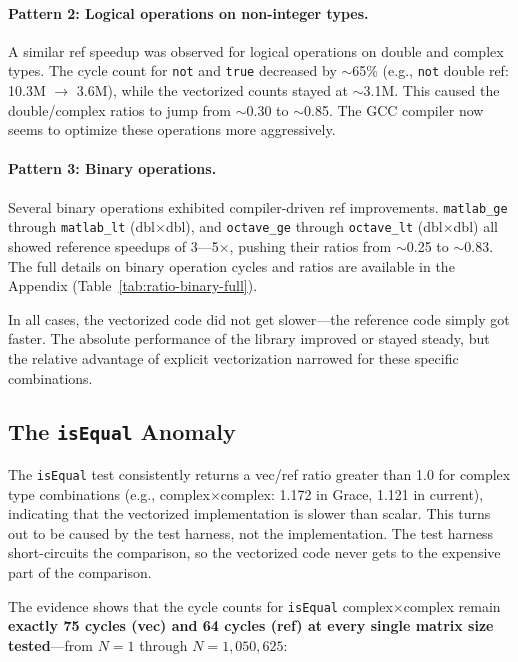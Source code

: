 \paragraph{Pattern 2: Logical operations on non-integer types.} A similar ref speedup was observed for logical operations on double and complex types. The cycle count for \texttt{not} and \texttt{true} decreased by $\sim$65\% (e.g., \texttt{not} double ref: 10.3M $\rightarrow$ 3.6M), while the vectorized counts stayed at $\sim$3.1M. This caused the double/complex ratios to jump from $\sim$0.30 to $\sim$0.85. The GCC compiler now seems to optimize these operations more aggressively.

\paragraph{Pattern 3: Binary operations.} Several binary operations exhibited compiler-driven ref improvements. \texttt{matlab\_ge} through \texttt{matlab\_lt} (dbl$\times$dbl), and \texttt{octave\_ge} through \texttt{octave\_lt} (dbl$\times$dbl) all showed reference speedups of 3---5$\times$, pushing their ratios from $\sim$0.25 to $\sim$0.83. The full details on binary operation cycles and ratios are available in the Appendix (Table~\ref{tab:ratio-binary-full}).

In all cases, the vectorized code did not get slower---the reference code simply got faster. The absolute performance of the library improved or stayed steady, but the relative advantage of explicit vectorization narrowed for these specific combinations.

\subsection{The \texttt{isEqual} Anomaly}

The \texttt{isEqual} test consistently returns a vec/ref ratio greater than 1.0 for complex type combinations (e.g., complex$\times$complex: 1.172 in Grace, 1.121 in current), indicating that the vectorized implementation is slower than scalar. This turns out to be caused by the test harness, not the implementation. The test harness short-circuits the comparison, so the vectorized code never gets to the expensive part of the comparison.

The evidence shows that the cycle counts for \texttt{isEqual} complex$\times$complex remain \textbf{exactly 75 cycles (vec) and 64 cycles (ref) at every single matrix size tested}---from $N=1$ through $N=1{,}050{,}625$:

